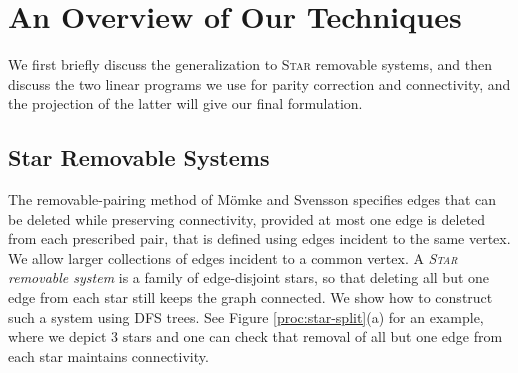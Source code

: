 \documentclass[11pt]{amsart}
\newcommand{\1}{\mathbbm{1}}
\begin{document}
\section{An Overview of Our  Techniques}
We first briefly discuss the generalization to \textsc{Star} removable systems, and then discuss the two linear programs we use for parity correction and connectivity, {and the projection of the latter will give our final formulation.} 

\subsection{Star Removable Systems} The removable-pairing method of M\"omke and Svensson specifies
edges that can be deleted while preserving connectivity, provided
at most one edge is deleted from each prescribed pair, that is defined using edges incident to the same vertex.
We allow larger collections of edges incident to a common vertex.
A \emph{\textsc{Star} removable system} is a family of edge-disjoint stars, so that deleting all but one edge from each star still keeps the graph connected. We show how to construct such a system using DFS trees. {See Figure \ref{proc:star-split}(a) for an example, where we depict 3 stars and one can check that removal of all but one edge from each star maintains connectivity.}
\end{document}
